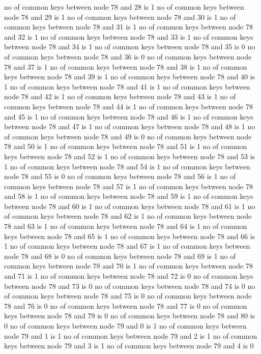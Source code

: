 no of common keys between node 78 and 28 is 1
no of common keys between node 78 and 29 is 1
no of common keys between node 78 and 30 is 1
no of common keys between node 78 and 31 is 1
no of common keys between node 78 and 32 is 1
no of common keys between node 78 and 33 is 1
no of common keys between node 78 and 34 is 1
no of common keys between node 78 and 35 is 0
no of common keys between node 78 and 36 is 0
no of common keys between node 78 and 37 is 1
no of common keys between node 78 and 38 is 1
no of common keys between node 78 and 39 is 1
no of common keys between node 78 and 40 is 1
no of common keys between node 78 and 41 is 1
no of common keys between node 78 and 42 is 1
no of common keys between node 78 and 43 is 1
no of common keys between node 78 and 44 is 1
no of common keys between node 78 and 45 is 1
no of common keys between node 78 and 46 is 1
no of common keys between node 78 and 47 is 1
no of common keys between node 78 and 48 is 1
no of common keys between node 78 and 49 is 0
no of common keys between node 78 and 50 is 1
no of common keys between node 78 and 51 is 1
no of common keys between node 78 and 52 is 1
no of common keys between node 78 and 53 is 1
no of common keys between node 78 and 54 is 1
no of common keys between node 78 and 55 is 0
no of common keys between node 78 and 56 is 1
no of common keys between node 78 and 57 is 1
no of common keys between node 78 and 58 is 1
no of common keys between node 78 and 59 is 1
no of common keys between node 78 and 60 is 1
no of common keys between node 78 and 61 is 1
no of common keys between node 78 and 62 is 1
no of common keys between node 78 and 63 is 1
no of common keys between node 78 and 64 is 1
no of common keys between node 78 and 65 is 1
no of common keys between node 78 and 66 is 1
no of common keys between node 78 and 67 is 1
no of common keys between node 78 and 68 is 0
no of common keys between node 78 and 69 is 1
no of common keys between node 78 and 70 is 1
no of common keys between node 78 and 71 is 1
no of common keys between node 78 and 72 is 0
no of common keys between node 78 and 73 is 0
no of common keys between node 78 and 74 is 0
no of common keys between node 78 and 75 is 0
no of common keys between node 78 and 76 is 0
no of common keys between node 78 and 77 is 0
no of common keys between node 78 and 79 is 0
no of common keys between node 78 and 80 is 0
no of common keys between node 79 and 0 is 1
no of common keys between node 79 and 1 is 1
no of common keys between node 79 and 2 is 1
no of common keys between node 79 and 3 is 1
no of common keys between node 79 and 4 is 0
